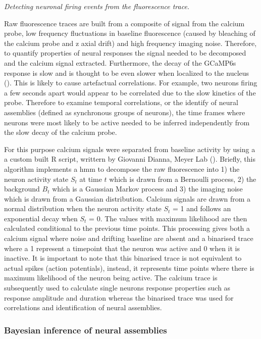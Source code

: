 {\medium \textit{Detecting neuronal firing events from the fluorescence trace.}\par}
Raw fluorescence traces are built from a composite of signal from the calcium probe, low frequency fluctuations in baseline fluorescence (caused by bleaching of the calcium probe and z axial drift) and high frequency imaging noise.  Therefore, to quantify properties of neural responses the signal needed to be decomposed and the calcium signal extracted.
Furthermore, the decay of the GCaMP6s response is slow and is thought to be even slower when localized to the nucleus (\cite{Chen2013, Vladimirov2014}). This is likely to cause artefactual correlations. For example, two neurons firing a few seconds apart would appear to be correlated due to the slow kinetics of the probe. Therefore to examine temporal correlations, or the identify of neural assemblies (defined as synchronous groups of neurons), the time frames where neurons were most likely to be active needed to be inferred independently from the slow decay of the calcium probe.

For this purpose calcium signals were separated from baseline activity by using a a custom built R script, writtern by Giovanni Dianna, Meyer Lab (\cite{Diana2019BayesianAssemblies}). Briefly, this algorithm implements a \gls{hmm} to decompose the raw fluorescence into 1) the neuron activity state $S_{t}$ at time $t$ which is drawn from a Bernoulli process, 2) the background $B_{t}$ which is a Gaussian Markov process and 3) the imaging noise which is drawn from a Gaussian distribution.  Calcium signals are drawn from a normal distribution when the neuron activity state $S_{t}$ = 1 and follows an exponential decay when $S_{t}$ = 0. The values with maximum likelihood are then calculated conditional to the previous time points.  This processing gives both a calcium signal where noise and drifting baseline are absent and a binarised trace where a 1 represent a timepoint that the neuron was active and 0 when it is inactive. It is important to note that this binarised trace is not equivalent to actual spikes (action potentials), instead, it represents time points where there is maximum likelihood of the neuron being active. The calcium trace is subsequently used to calculate single neurons response properties such as response amplitude and duration whereas the binarised trace was used for correlations and identification of neural assemblies.

\subsubsection{Bayesian inference of neural assemblies}

